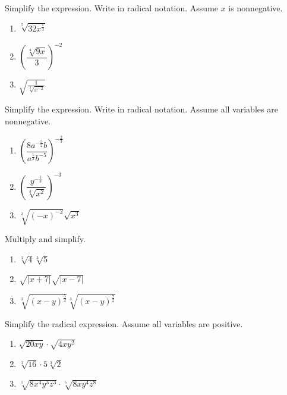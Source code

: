 \documentclass[
  en,11pt]{elegantbook}
\let\BeginKnitrBlock\begin \let\EndKnitrBlock\end
\begin{document}
\BeginKnitrBlock{exercise}
\protect\hypertarget{exr:unnamed-chunk-94}{}{\label{exr:unnamed-chunk-94} }
Simplify the expression. Write in radical notation. Assume \(x\) is nonnegative.

\begin{enumerate}
\def\labelenumi{\arabic{enumi}.}

\item
  \(\sqrt[5]{32x^{\frac13}}\)
\item
  \(\left(\dfrac{\sqrt[4]{9x}}{3}\right)^{-2}\)
\item
  \(\sqrt{\frac{1}{\sqrt[3]{x^{-2}}}}\)
\end{enumerate}
\EndKnitrBlock{exercise}

\BeginKnitrBlock{exercise}
\protect\hypertarget{exr:unnamed-chunk-95}{}{\label{exr:unnamed-chunk-95} }
Simplify the expression. Write in radical notation. Assume all variables are nonnegative.

\begin{enumerate}
\def\labelenumi{\arabic{enumi}.}

\item
  \(\left(\dfrac{8a^{-\frac{5}{2}}b}{a^{\frac12}b^{-5}}\right)^{-\frac23}\)
\item
  \(\left(\dfrac{y^{-\frac{1}{3}}}{\sqrt[3]{x^{2}}}\right)^{-3}\)
\item
  \(\sqrt[3]{(-x)^{-2}}\sqrt{x^3}\)
\end{enumerate}
\EndKnitrBlock{exercise}

\BeginKnitrBlock{exercise}
\protect\hypertarget{exr:unnamed-chunk-96}{}{\label{exr:unnamed-chunk-96} }
Multiply and simplify.

\begin{enumerate}
\def\labelenumi{\arabic{enumi}.}

\item
  \(\sqrt[3]{4}\sqrt[3]{5}\)
\item
  \(\sqrt{|x+7|}\sqrt{|x-7|}\)
\item
  \(\sqrt[3]{(x-y)^{\frac52}}\sqrt[3]{(x-y)^{\frac72}}\)
\end{enumerate}
\EndKnitrBlock{exercise}

\BeginKnitrBlock{exercise}
\protect\hypertarget{exr:unnamed-chunk-97}{}{\label{exr:unnamed-chunk-97} }
Simplify the radical expression. Assume all variables are positive.

\begin{enumerate}
\def\labelenumi{\arabic{enumi}.}

\item
  \(\sqrt{20xy}\cdot\sqrt{4xy^2}\)
\item
  \(\sqrt[3]{16}\cdot5\sqrt[3]{2}\)
\item
  \(\sqrt[5]{8x^4y^3z^3}\cdot\sqrt[5]{8xy^4z^8}\)
\end{enumerate}
\EndKnitrBlock{exercise}
\end{document}

